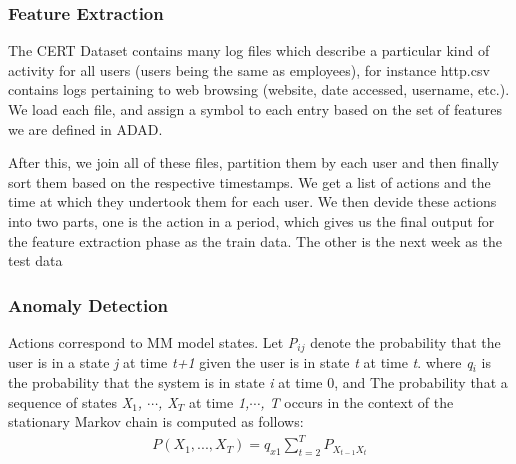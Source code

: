 \documentclass[conference]{IEEEtran}
\begin{document}
\subsubsection{Feature Extraction}

The CERT Dataset contains many log files which describe a particular kind of activity for all users (users being the same as employees), for instance http.csv contains logs pertaining to web browsing (website, date accessed, username, etc.). We load each file, and assign a symbol to each entry based on the set of features we are defined in ADAD. 

After this, we join all of these files, partition them by each user and then finally sort them based on the respective timestamps. We get a list of actions and the time at which they undertook them for each user.
We then devide these actions into two parts, one is the action in a period, which gives us the final output for the feature extraction phase as the train data. The other is the next week as the test data

\subsubsection{Anomaly Detection}

Actions correspond to MM model states. Let \emph{P$_{ij}$} denote the probability that the user is in a state \emph{j} at time \emph{t+1} given the user is in state \emph{t} at time \emph{t}. 
where \emph{q$_{i}$} is the probability that the system is in state \emph{i} at time 0, and
The probability that a sequence of states \emph{X$_1$, $\cdots$, X$_T$} at time \emph{1,$\cdots$, T} occurs in the context of the stationary Markov chain is computed as follows:
\begin{align}
P(X_1,...,X_T)=q_{x1}\sum_{t=2}^T P_{X_{t-1}X_t}
\end{align}
\end{document}
